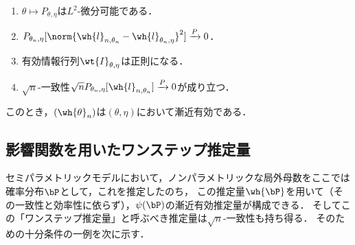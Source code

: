 \documentclass[uplatex, dvipdfmx]{jsarticle}
\begin{document}
\begin{theorem}\mbox{}
    \begin{enumerate}[({S}1)]
        \item $\theta\mapsto P_{\theta,\eta}$は$L^2$-微分可能である．
        \item $P_{\theta_n,\eta}[\norm{\wh{l}_{n,\theta_n}-\wh{l}_{\theta_n,\eta}}^2]\xrightarrow{P}0$．
        \item 有効情報行列$\wt{I}_{\theta,\eta}$は正則になる．
        \item $\sqrt{n}$-一致性$\sqrt{n}P_{\theta_n,\eta}[\wh{l}_{n,\theta_n}]\xrightarrow{P}0$が成り立つ．
    \end{enumerate}
    このとき，$(\wh{\theta}_n)$は$(\theta,\eta)$において漸近有効である．
\end{theorem}

\subsection{影響関数を用いたワンステップ推定量}

\begin{tcolorbox}[colframe=ForestGreen, colback=ForestGreen!10!white,breakable,colbacktitle=ForestGreen!40!white,coltitle=black,fonttitle=\bfseries\sffamily,
title=]
    セミパラメトリックモデルにおいて，ノンパラメトリックな局外母数をここでは確率分布$\bP$として，これを推定したのち，
    この推定量$\wh{\bP}$を用いて（その一致性と効率性に依らず），$\psi(\bP)$の漸近有効推定量が構成できる．
    そしてこの「ワンステップ推定量」と呼ぶべき推定量は$\sqrt{n}$-一致性も持ち得る．
    そのための十分条件の一例を次に示す．
\end{tcolorbox}
\end{document}
